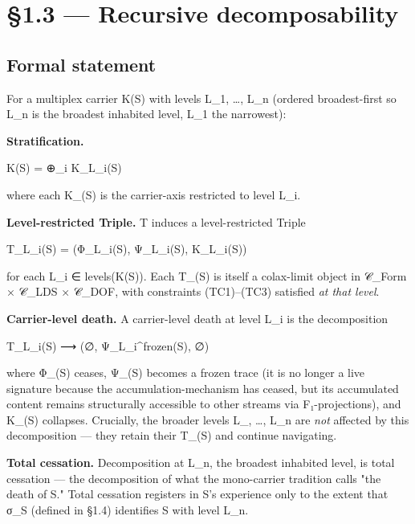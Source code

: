 \documentclass[11pt, openany]{book}
\begin{document}
\section{§1.3 --- Recursive decomposability}

\subsection{Formal statement}

For a multiplex carrier Κ(S) with levels {L\_\allowbreak{}1, …, L\_\allowbreak{}n} (ordered broadest-first so L\_\allowbreak{}n is the broadest inhabited level, L\_\allowbreak{}1 the narrowest):

\textbf{Stratification.}
\begin{Code}
Κ(S) = ⊕_i Κ_{L_i}(S)
\end{Code}
where each Κ\_(S) is the carrier-axis restricted to level L\_\allowbreak{}i.

\textbf{Level-restricted Triple.} T induces a level-restricted Triple
\begin{Code}
T_{L_i}(S) = (Φ_{L_i}(S), Ψ_{L_i}(S), Κ_{L_i}(S))
\end{Code}
for each L\_\allowbreak{}i ∈ levels(Κ(S)). Each T\_(S) is itself a colax-limit object in 𝒞\_\allowbreak{}Form × 𝒞\_\allowbreak{}LDS × 𝒞\_\allowbreak{}DOF, with constraints (TC1)–(TC3) satisfied \textit{at that level}.

\textbf{Carrier-level death.} A carrier-level death at level L\_\allowbreak{}i is the decomposition
\begin{Code}
T_{L_i}(S) ⟶ (∅, Ψ_{L_i}^frozen(S), ∅)
\end{Code}
where Φ\_(S) ceases, Ψ\_(S) becomes a frozen trace (it is no longer a live signature because the accumulation-mechanism has ceased, but its accumulated content remains structurally accessible to other streams via F₁-projections), and Κ\_(S) collapses. Crucially, the broader levels L\_, …, L\_\allowbreak{}n are \textit{not} affected by this decomposition --- they retain their T\_(S) and continue navigating.

\textbf{Total cessation.} Decomposition at L\_\allowbreak{}n, the broadest inhabited level, is total cessation --- the decomposition of what the mono-carrier tradition calls "the death of S." Total cessation registers in S's experience only to the extent that σ\_\allowbreak{}S (defined in §1.4) identifies S with level L\_\allowbreak{}n.
\end{document}
